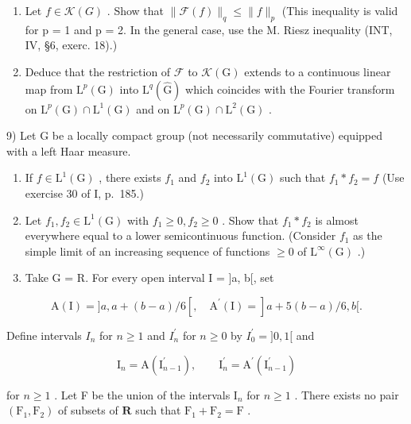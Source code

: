 \begin{enumerate}
\def\labelenumi{\alph{enumi})}
\item
  Let \(f \in \mathcal{K}(G)\) . Show that \(\|\mathcal{F}(f)\|_{q} \leqslant \|f\|_{p}\) (This inequality is valid for p = 1 and p = 2. In the general case, use the M. Riesz inequality (INT, IV, §6, exerc. 18).)
\item
  Deduce that the restriction of \(\mathcal{F}\) to \(\mathcal{K}(\mathrm{G})\) extends to a continuous linear map from \(\mathrm{L}^p (\mathrm{G})\) into \(\mathrm{L}^q (\widehat{\mathrm{G}})\) which coincides with the Fourier transform on \(\mathrm{L}^p (\mathrm{G})\cap \mathrm{L}^1 (\mathrm{G})\) and on \(\mathrm{L}^p (\mathrm{G})\cap \mathrm{L}^2 (\mathrm{G})\) .
\end{enumerate}

9) Let G be a locally compact group (not necessarily commutative) equipped with a left Haar measure.

\begin{enumerate}
\def\labelenumi{\alph{enumi})}
\item
  If \(f \in \mathrm{L}^{1}(\mathrm{G})\) , there exists \(f_{1}\) and \(f_{2}\) into \(\mathrm{L}^{1}(\mathrm{G})\) such that \(f_{1} * f_{2} = f\) (Use exercise 30 of I, p.~185.)
\item
  Let \(f_{1}, f_{2} \in \mathrm{L}^{1}(\mathrm{G})\) with \(f_{1} \geqslant 0, f_{2} \geqslant 0\) . Show that \(f_{1} * f_{2}\) is almost everywhere equal to a lower semicontinuous function. (Consider \(f_{1}\) as the simple limit of an increasing sequence of functions \(\geqslant 0\) of \(\mathrm{L}^{\infty}(\mathrm{G})\) .)
\item
  Take G = R. For every open interval I = {]}a, b{[}, set
\end{enumerate}

\[
\mathrm{A} (\mathrm{I}) = ] a, a + (b - a) / 6 [, \quad \mathrm{A} ^ {\prime} (\mathrm{I}) = ] a + 5 (b - a) / 6, b [.
\]

Define intervals \(I_{n}\) for \(n \geqslant 1\) and \(I_{n}^{\prime}\) for \(n \geqslant 0\) by \(I_{0}^{\prime} = ]0, 1[\) and

\[
\mathrm{I} _ {n} = \mathrm{A} (\mathrm{I} _ {n - 1} ^ {\prime}), \qquad \mathrm{I} _ {n} ^ {\prime} = \mathrm{A} ^ {\prime} (\mathrm{I} _ {n - 1} ^ {\prime})
\]

for \(n \geqslant 1\) . Let F be the union of the intervals \(\mathrm{I}_n\) for \(n \geqslant 1\) . There exists no pair \((\mathrm{F}_1, \mathrm{F}_2)\) of subsets of \(\mathbf{R}\) such that \(\mathrm{F}_1 + \mathrm{F}_2 = \mathrm{F}\) .

